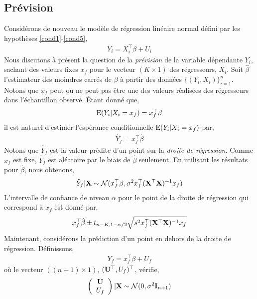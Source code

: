 \subsection{Prévision}
Considérons de nouveau le modèle de régression linéaire normal défini par les hypothèses \ref{cond1}-\ref{cond5},
\begin{align*}
Y_i = X_i^\top\beta+U_i
\end{align*}
Nous discutons à présent la question de la \emph{prévision} de la variable dépendante $Y_i$, sachant des valeurs fixes $x_f$ pour le vecteur $(K\times 1)$ des régresseurs, $X_i$. Soit $\hat{\beta}$ l'estimateur des moindres carrés de $\beta$ à partir des données $\{(Y_i, X_i)\}_{i=1}^n$. Notons que $x_f$ peut ou ne peut pas être une des valeurs réalisées des régresseurs dans l'échantillon observé. \'Etant donné que,
\begin{align*}
\operatorname{E}(Y_i| X_i=x_f) = x_f^\top\beta
\end{align*} 
il est naturel d'estimer l'espérance conditionnelle $\operatorname{E}(Y_i|X_i =x_f)$ par,
\begin{align}
\hat{Y}_f = x_f^\top\hat{\beta}
\label{eq54}
\end{align}
Notons que $\hat{Y}_f$ est la valeur prédite d'un point sur la \emph{droite de régression}. Comme $x_f$ est fixe, $\hat{Y}_f $ est aléatoire par le biais de $\hat{\beta}$ seulement. En utilisant les résultats pour $\hat{\beta}$, nous obtenons,
\begin{align*}
\hat{Y}_f|\mathbf X \sim \mathcal{N}(x_f^\top\beta, \sigma^2x_f^\top(\mathbf X^\top\mathbf X)^{-1}x_f)
\end{align*}
L'intervalle de confiance de niveau $\alpha$ pour le point de la droite de régression qui correspond à $x_f$ est donné par,
\begin{align*}
x_f^\top\hat{\beta} \pm t_{n-K, 1-\alpha/2}\sqrt{s^2x_f^\top (\mathbf X^\top\mathbf X)^{-1}x_f}
\end{align*}
Maintenant, considérons la prédiction d'un point en dehors de la droite de régression. Définissons,
\begin{align*}
Y_f = x_f^\top\beta + U_f
\end{align*}
où le vecteur $((n+1) \times 1)$, $(\mathbf U^\top, U_f)^\top$, vérifie,
\begin{align}
\left(
\begin{array}{c}
\mathbf U\\
U_f
\end{array}
\right)|\mathbf X
\sim
\mathcal{N}(0, \sigma^2\mathbf{I}_{n+1})
\label{eq55}
\end{align}

